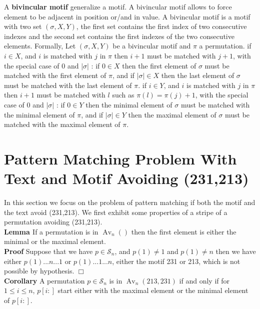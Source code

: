 \documentclass[12pt, a4paper]{article}
\DeclareMathOperator{\Avd}{Av}
\newcommand\Av[2]{\Avd_{{#1}}({#2})}
\newcommand{\Perm}[1]{\mathcal{S}_{#1}}
\newcommand{\ptext}{\pi}
\newcommand{\pmotif}{\sigma}
\newcommand{\x}{X}
\newcommand{\y}{Y}
\newcommand{\bmotif}{(\sigma,\x,\y)}
\newcounter{num}
\newcommand{\num}{\stepcounter{num} }
\newcommand{\numl}[1]{\refstepcounter{num}\label{#1}}
\begin{document}
		A \textbf{bivincular motif} generalize
		a motif. 
		A bivincular motif allows 
		to force element to be adjacent in position
		or/and in value.
		A bivincular motif
		is a motif with two set $\bmotif$,
		the first set contains the first index 
		of two consecutive indexes
		and the second set contains the first indexes
		of the two consecutive elements.
		Formally, Let $\bmotif$ 
		be a bivincular motif 
		and $\ptext$ a permutation.
		if $i \in \x$,
		and $i$ is matched with $j$ in $\ptext$
		then $i+1$ must be matched with $j+1$,
		with the special case of $0$ and $|\pmotif|$ :
		if $0 \in \x$ then the first element of $\pmotif$
		must be matched with the first element of $\ptext$,
		and if $|\pmotif| \in \x$ then the last element of $\pmotif$
		must be matched with the last element of $\ptext$.
		if $i \in \y$,
		and $i$ is matched with $j$ in $\ptext$
		then $i+1$ must be matched with $l$
		such as $\ptext(l)=\ptext(j)+1$,
		with the special case of $0$ and $|\pmotif|$ :
		if $0 \in \y$ then the minimal element of $\pmotif$
		must be matched with the minimal element of $\ptext$,
		and if $|\pmotif| \in \y$ then the maximal element of $\pmotif$
		must be matched with the maximal element of $\ptext$.		
			
	\section{Pattern Matching Problem With Text and Motif Avoiding (231,213)}

		In this section we focus 
		on the problem of pattern matching if
		both the motif and the text
		avoid (231,213).
		We first exhibit some properties of a stripe 
		of a permutation avoiding (231,213).\\

		\textbf{Lemma  \numl{firstelement} \thenum} If a permutation is in $\Av{n}{}$ 
		then the first element is either
		the minimal or the maximal element.\\
		
		\textbf{Proof} Suppose that we have
		$p \in \mathcal{S}_{n}$, and
		$p(1) \neq 1 $ and $p(1) \neq n$ then we have either
		$p(1) ... n ... 1$ or $p(1) ... 1 ... n $, either the motif 231 or 213, which is not possible by hypothesis. $\Box$\\
		
		\textbf{Corollary  \num \thenum} A permutation $p \in \Perm{n}$ is in $\Av{n}{213,231}$ if and only if for $1 \leq i \leq n$, 
		$p[i:]$ start either with the maximal element
		or the minimal element of $p[i:]$.\\
	
\end{document}
